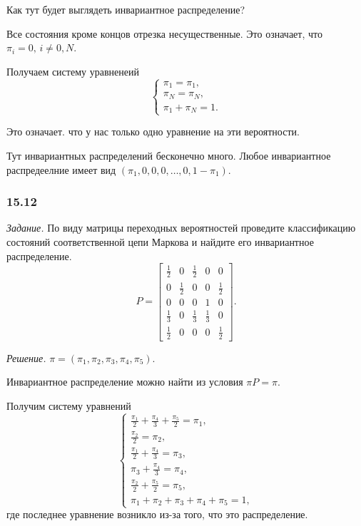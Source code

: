 Как тут будет выглядеть инвариантное распределение?

Все состояния кроме концов отрезка несущественные.
Это означает, что $ \pi_i = 0, \, i \neq 0, N$.

Получаем систему уравненеий
\begin{equation*}
  \begin{cases}
    \pi_1 = \pi_1, \\
    \pi_N = \pi_N, \\
    \pi_1 + \pi_N = 1.
  \end{cases}
\end{equation*}

Это означает. что у нас только одно уравнение на эти вероятности.

Тут инвариантных распределений бесконечно много.
Любое инвариантное распредеелние имеет вид $ \left( \pi_1, 0, 0, 0, \dotsc, 0, 1 - \pi_1 \right) $.

\subsubsection*{15.12}

\textit{Задание.}
По виду матрицы переходных вероятностей проведите классификацию состояний соответственной цепи
Маркова и найдите его инвариантное распределение.
\begin{equation*}
  P =
  \begin{bmatrix}
    \frac{1}{2} & 0 & \frac{1}{2} & 0 & 0 \\
    0 & \frac{1}{2} & 0 & 0 & \frac{1}{2} \\
    0 & 0 & 0 & 1 & 0 \\
    \frac{1}{3} & 0 & \frac{1}{3} & \frac{1}{3} & 0 \\
    \frac{1}{2} & 0 & 0 & 0 & \frac{1}{2}
  \end{bmatrix}.
\end{equation*}

\textit{Решение.}
$ \pi = \left( \pi_1, \pi_2, \pi_3, \pi_4, \pi_5 \right) $.

Инвариантное распределение можно найти из условия $ \pi P = \pi $.

Получим систему уравнений
\begin{equation*}
  \begin{cases}
    \frac{ \pi_1}{2} + \frac{ \pi_4}{3} + \frac{ \pi_5}{2} = \pi_1, \\
    \frac{ \pi_2}{2} = \pi_2, \\
    \frac{ \pi_1}{2} + \frac{ \pi_4}{3} = \pi_3, \\
    \pi_3 + \frac{ \pi_4}{3} = \pi_4, \\
    \frac{ \pi_2}{2} + \frac{ \pi_5}{2} = \pi_5, \\
    \pi_1 + \pi_2 + \pi_3 + \pi_4 + \pi_5 = 1,
  \end{cases}
\end{equation*}
где последнее уравнение возникло из-за того, что это распределение.

